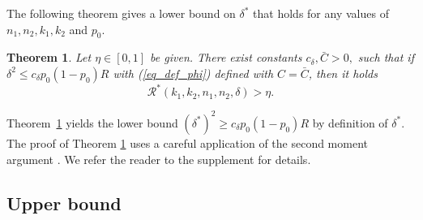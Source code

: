 \documentclass{article}
\newcommand{\cR}{\mathcal{R}}
\newcommand{\ju}[1]{{\color{blue}Julien: #1}}
\newcommand{\pa}[1]{{\color{red}Parker: #1}}
\newtheorem{theorem}{Theorem}
\begin{document}
The following theorem gives a lower bound on $\delta^*$ that holds for any values of $n_1, n_2, k_1,k_2$ and $p_0$.
\begin{theorem}\label{thm_lb}
    Let $\eta \in [0,1]$ be given. There exist constants $c_\delta, \bar{C} > 0, $ such that if $\delta^2 \leq c_\delta p_0(1-p_0)R$ with (\ref{eq_def_phi}) defined with $C = \bar{C}$, then it holds
    \[\cR^*(k_1, k_2, n_1,n_2, \delta) > \eta.\]
\end{theorem}
Theorem~\ref{thm_lb} yields the lower bound $(\delta^*)^2 \geq c_\delta p_0(1-p_0) R$ by definition of $\delta^*$. 
The proof of Theorem \ref{thm_lb} uses a careful application of the second moment argument \cite{lecam1973convergence,ingster1982minimax, ingster1987minimax, ingster2010detection, butucea2013detection, arias2014community}. We refer the reader to the supplement for details.
% 

\subsection{Upper bound}\label{sec:ub}
\end{document}
